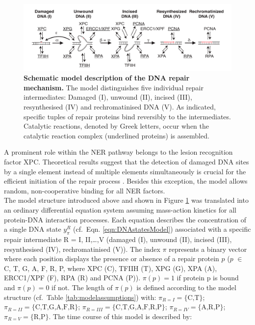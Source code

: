 \begin{figure}[t!]
\begin{center}
\includegraphics[width=1\textwidth]{Abbildungen/figure2_5.pdf}
\caption{\textbf{Schematic model description of the DNA repair mechanism.} The model distinguishes five individual repair intermediates: Damaged (I), unwound (II), incised (III), resynthesised (IV) and rechromatinised DNA (V). As indicated, specific tuples of repair proteins bind reversibly to the intermediates. Catalytic reactions, denoted by Greek letters, occur when the catalytic reaction complex (underlined proteins) is assembled. }
\label{fig:ModelStructure}
\end{center}
\end{figure}
A prominent role within the NER pathway belongs to the lesion recognition factor XPC. Theoretical results suggest that the detection of damaged DNA sites by a single element instead of multiple elements simultaneously is crucial for the efficient initiation of the repair process \cite{Politi2005}. Besides this exception, the model allows random, non-cooperative binding for all NER factors.\\    
The model structure introduced above and shown in Figure \ref{fig:ModelStructure} was translated into an ordinary differential equation system assuming mass-action kinetics for all protein-DNA interaction processes. Each equation describes the concentration of a single DNA state $y_{\pi}^{R}$ (cf.\ Eqn. \ref{eqn:DNAstatesModel}) associated with a specific repair intermediate R = I, II,\dots,V (damaged (I), unwound (II), incised (III), resynthesised (IV), rechromatinised (V)). The index $\pi$ represents a binary vector where each position displays the presence or absence of a repair protein $p$ ($p$ $\in$ {C, T, G, A, F, R, P}, where XPC (C), TFIIH (T), XPG (G), XPA (A), ERCC1/XPF (F), RPA (R) and PCNA (P)). $\pi(p)=1$ if protein p is bound and $\pi(p)=0$ if not. The length of $\pi(p)$ is defined according to the model structure (cf.\ Table \ref{tab:modelassumptions}) with: $\pi_{R=I} = \{ \text{C,T} \}$; $\pi_{R=II} = \{ \text{C,T,G,A,F,R} \}$; $\pi_{R=III} = \{ \text{C,T,G,A,F,R,P} \}$; $\pi_{R=IV} = \{ \text{A,R,P} \}$; $\pi_{R=V} = \{ \text{R,P} \}$. The time course of this model is described by:

